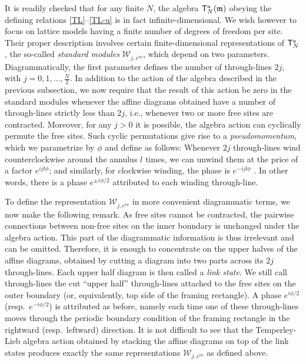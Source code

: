 \documentclass[a4paper,10pt]{article}
\newcommand{\aSt}{\mathcal{W}}
\newcommand{\AStTL}[2]{\aSt_{#1,#2}}
\newcommand{\ATL}[1]{\mathsf{T}^{\rm a}_{#1}}
\newcommand{\m}{\mathfrak{m}}
\begin{document}
It is readily checked that for any finite $N$, 
the algebra $\ATL{N}(\m)$ obeying the defining relations \eqref{TL}--\eqref{TL-u} is in fact infinite-dimensional. We wish however to focus on lattice models having a finite number of degrees of freedom per site. Their proper description involves certain finite-dimensional representations of $\ATL{N}$, the so-called {\em standard modules} $\AStTL{j}{e^{i\phi}}$, which depend on two parameters. Diagrammatically, the first parameter defines the number of
through-lines $2j$, with $j=0,1,\ldots, \frac{N}{2}$. In addition to the action of the algebra described in the previous subsection,
we now require that the result of this action be zero in the standard modules whenever the affine diagrams  obtained have a number of
through-lines strictly less than $2j$, i.e., whenever two or more free sites are contracted. Moreover, for any $j>0$ it is possible,
the algebra action can cyclically
permute the free sites. Such cyclic permutations give rise to a
{\em pseudomomentum}, which we parametrize by $\phi$ and define as follows:
Whenever $2j$ through-lines wind counterclockwise around
the annulus $l$ times, we can unwind them at the price of a factor
$e^{ijl\phi}$; and similarly, for clockwise winding, the phase is $e^{-i jl\phi}$ \cite{MartinSaleur,MartinSaleur1}. In other words, there is a phase $e^{\pm i\phi/2}$ attributed to each winding through-line.

To define the representation $\AStTL{j}{e^{i\phi}}$ in more convenient diagrammatic terms, we now make the following remark. As free sites cannot be contracted, the pairwise connections between non-free sites on the inner boundary is unchanged under the algebra action. This part of the diagrammatic information is thus irrelevant and can be omitted. Therefore, it is enough to concentrate on the upper halves of the affine diagrams, obtained by cutting a diagram into two parts across its $2j$ through-lines. Each upper half diagram is then called a {\em link state}. We still call through-lines the cut ``upper half'' through-lines attached to the free sites on the outer boundary (or, equivalently, top side of the framing rectangle). A phase $e^{i\phi/2}$ (resp.\ $e^{-i\phi/2}$) is attributed as before, namely each time one of these through-lines moves through the periodic boundary condition of the framing rectangle in the rightward (resp.\ leftward) direction. It is not difficult to see that the Temperley-Lieb algebra action obtained by stacking the affine diagrams on top of the link states produces exactly the same representations $\AStTL{j}{e^{i\phi}}$ as defined above.
 
\end{document}
